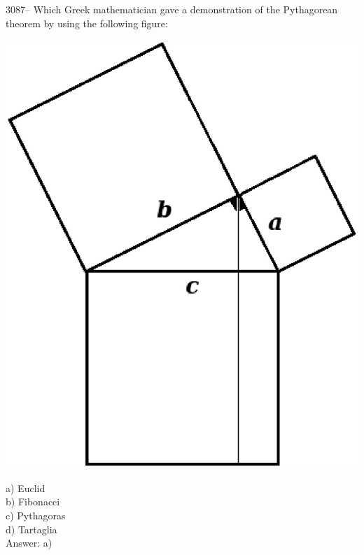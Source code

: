 \documentclass[letterpaper, 12pt]{article}
\begin{document}
3087-- Which Greek mathematician gave a demonstration of the Pythagorean theorem by using the following figure:\\
\begin{center}
\includegraphics[scale=0.3]{pyth_euclide.eps}\\
\end{center}

a) Euclid\\
b) Fibonacci\\
c) Pythagoras\\
d) Tartaglia\\

Answer: a)\\
\end{document}

